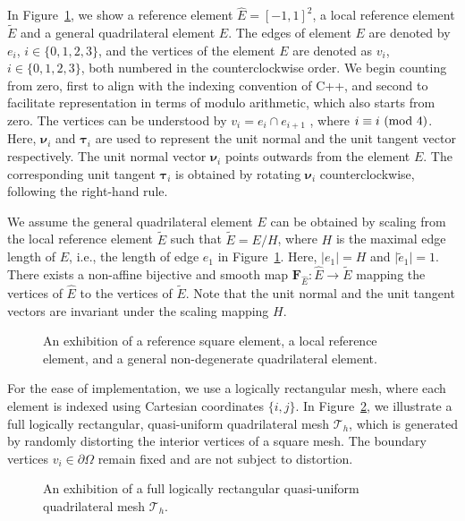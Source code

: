 In Figure~\ref{fig:meshexample}, we show a reference element  
$\hat{E} = [-1,1]^2$,
a local reference element $\tilde{E}$
and a general quadrilateral element $E$.
The edges of element $E$ are denoted by $e_i$, $i\in\{0,1,2,3\}$, and the vertices of the 
element $E$ are denoted as $v_i$, $i\in \{0,1,2,3\}$, both numbered in the counterclockwise order.
We begin counting from zero, first to align with the indexing convention of C++, 
and second to facilitate representation in terms of modulo arithmetic, which
also starts from zero.
The vertices can be understood by $v_i = e_i \cap e_{i+1}$ 
, where $i\equiv i\ (\mathrm{mod}\ 4)$.
Here, $\pmb{\nu}_i$ and $\pmb{\tau}_i$ are used to represent the unit 
normal and the unit tangent
vector respectively. The unit normal vector $\pmb{\nu}_i$ points outwards 
from the element $E$. The corresponding unit tangent $\pmb{\tau}_i$ is obtained by rotating 
$\pmb{\nu}_i$ counterclockwise, following the right-hand rule.

We assume the general quadrilateral element $E$ can be obtained by scaling from the local reference element $\tilde{E}$ such
that $\tilde{E} = E/H$, where $H$ is the maximal edge length of $E$, i.e., the length of edge $e_1$ in Figure~\ref{fig:meshexample}.
Here, $\lvert e_1 \rvert = H$ and $\lvert \tilde{e}_1 \rvert = 1$.
There exists a non-affine bijective and smooth map $\mathbf{F}_{\hat{E}}: \hat{E} \rightarrow \tilde{E}$ mapping the vertices of $\hat{E}$ to
the vertices of $\tilde{E}$.
Note that the unit normal and the unit tangent vectors are invariant under the scaling mapping $H$.
\begin{figure}[ht]
\centering

\caption{An exhibition of a reference square element, a local reference element, and a general non-degenerate quadrilateral element.}
\label{fig:meshexample}
\end{figure}

For the ease of implementation, we use a logically rectangular mesh, 
where each element is indexed using 
Cartesian coordinates $\{i,j\}$. 
In Figure~\ref{fig:fullmesh}, we illustrate a full logically rectangular, quasi-uniform quadrilateral mesh $\mathcal{T}_h$,
which is generated by randomly distorting the interior vertices of a square mesh.
The boundary vertices $v_i \in \partial \Omega$ remain fixed and are not subject to distortion.
\begin{figure}[ht]
\centering

\caption{An exhibition of a full logically rectangular quasi-uniform quadrilateral mesh $\mathcal{T}_h$.}
\label{fig:fullmesh}
\end{figure}

